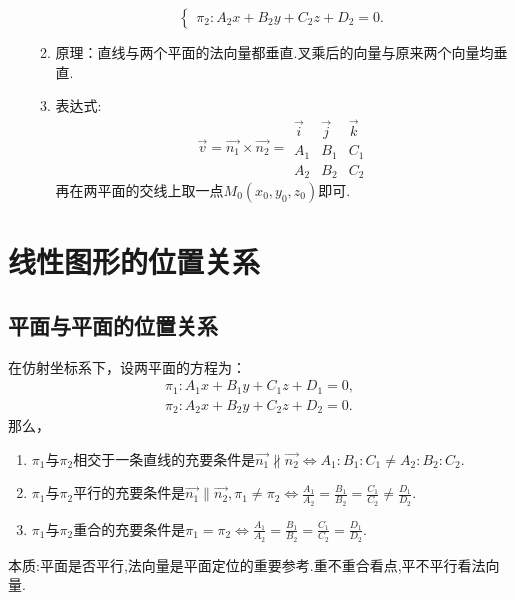 \begin{enumerate}[\large1.]
\begin{enumerate}[]
\begin{equation*}
\begin{cases}
		\pi_2:A_2x+B_2y+C_2z+D_2=0.
		\end{cases}
		\end{equation*}
		\item 原理：直线与两个平面的法向量都垂直.叉乘后的向量与原来两个向量均垂直.
		\item 表达式:
		\begin{equation}
		\overrightarrow{v}=\overrightarrow{n_1}\times\overrightarrow{n_2}=
		\begin{array}{|ccc|}
		\overrightarrow{i} &\overrightarrow{j}  &\overrightarrow{k}  \\ 
		A_1 & B_1 & C_1 \\ 
		A_2 & B_2 & C_2
		\end{array} 
		\end{equation}
		再在两平面的交线上取一点$M_0(x_0,y_0,z_0)$即可.
	\end{enumerate}
\end{enumerate}


\section{线性图形的位置关系}
\subsection{平面与平面的位置关系}
\ttheorem[平面与平面的位置关系]
\quad 在仿射坐标系下，设两平面的方程为：
\begin{equation*}
\begin{array}{c}
\pi_1:A_1x+B_1y+C_1z+D_1=0,\\
\pi_2:A_2x+B_2y+C_2z+D_2=0.
\end{array}
\end{equation*}
那么，
\begin{enumerate}[$\mathrm (1)$]
	\setlength{\itemindent}{3em}
	\setlength{\topsep}{0.01em}
	\setlength{\itemsep}{0.01em}
	\item $\pi _1$与$\pi_2$相交于一条直线的充要条件是$\overrightarrow{n_1} \nparallel \overrightarrow{n_2} \Leftrightarrow A_1:B_1:C_1\ne A_2:B_2:C_2$.
	\item  $\pi _1$与$\pi_2$平行的充要条件是$\overrightarrow{n_1}\parallel\overrightarrow{n_2},\pi_1 \ne \pi_2 \Leftrightarrow \displaystyle \frac{A_1}{A_2}=\frac{B_1}{B_2}=\frac{C_1}{C_2} \ne \frac{D_1}{D_2}$.
	\item  $\pi _1$与$\pi_2$重合的充要条件是$\pi_1 = \pi_2 \Leftrightarrow \displaystyle \frac{A_1}{A_2}=\frac{B_1}{B_2}=\frac{C_1}{C_2}= \frac{D_1}{D_2}$.
\end{enumerate}
{\color{dy}本质:平面是否平行,法向量是平面定位的重要参考.重不重合看点,平不平行看法向量.}

